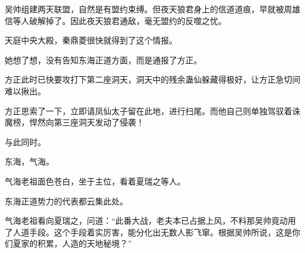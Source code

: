 \begin{this_body}
吴帅组建两天联盟，自然是有盟约束缚。但夜天狼君身上的信道道痕，早就被周雄信等人破解掉了。因此夜天狼君通敌，毫无盟约的反噬之忧。

天庭中央大殿，秦鼎菱很快就得到了这个情报。

她想了想，没有告知东海正道方面，而是通报了方正。

方正此时已快要攻打下第二座洞天，洞天中的残余蛊仙躲藏得极好，让方正急切间难以揪出。

方正思索了一下，立即请凤仙太子留在此地，进行扫尾。而他自己则单独驾驭着诛魔榜，悍然向第三座洞天发动了侵袭！

与此同时。

东海，气海。

气海老祖面色苍白，坐于主位，看着夏瑞之等人。

东海正道势力的代表都云集此处。

气海老祖看向夏瑞之，问道：“此番大战，老夫本已占据上风，不料那吴帅竟动用了人道手段。这个手段着实厉害，能分化出无数人影飞窜。根据吴帅所说，这是你们夏家的积累，人造的天地秘境？”

\end{this_body}

